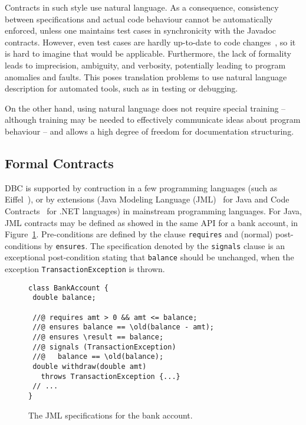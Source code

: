 Contracts in such style use natural language. As a consequence, consistency between specifications and actual code behaviour cannot be automatically enforced, unless one maintains test cases in synchronicity with the Javadoc contracts. However, even test cases are hardly up-to-date to code changes~\cite{Hao2013}, so it is hard to imagine that would be applicable. 
Furthermore, the lack of formality leads to imprecision, ambiguity, and verbosity, potentially leading to program anomalies and faults.
This poses translation problems to use natural language description for automated tools, such as in testing or debugging.

On the other hand, using natural language does not require special training -- although training may be needed to effectively communicate
ideas about program behaviour -- and allows a high degree of freedom for documentation structuring. 


\subsection{Formal Contracts}


DBC is supported by contruction in a few programming languages (such as Eiffel~\cite{eiffel}), or by extensions (Java Modeling Language (JML)~\cite{jml} for Java and Code Contracts~\cite{codeContractsPaper} for .NET languages) in mainstream programming languages.
For Java, JML contracts may be defined as showed in the same API for a bank account, in Figure~\ref{Fig-JML-Bank}. Pre-conditions
are defined by the clause {\lstinline!requires!} and (normal) post-conditions by {\lstinline!ensures!}. The specification
denoted by the {\lstinline!signals!} clause
is an exceptional post-condition stating that {\lstinline!balance!} should be unchanged, when the exception \texttt{TransactionExcep\-tion} is thrown.

\begin{figure}
\begin{lstlisting}[basicstyle=\footnotesize\ttfamily,name=figxpi]
class BankAccount {
 double balance;

 //@ requires amt > 0 && amt <= balance;
 //@ ensures balance == \old(balance - amt);
 //@ ensures \result == balance;
 //@ signals (TransactionException) 
 //@   balance == \old(balance);
 double withdraw(double amt) 
   throws TransactionException {...}
 // ...
}
\end{lstlisting}
\caption{The JML specifications for the bank account.}
\label{Fig-JML-Bank}
\end{figure}


